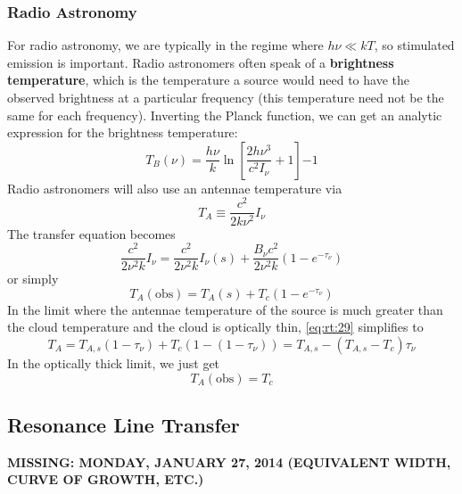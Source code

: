 \documentclass[10pt]{article}
\numberwithin{equation}{section}
\begin{document}
\subsubsection{Radio Astronomy} %
\label{ssub:radio_astronomy}
For radio astronomy, we are typically in the regime where $h\nu\ll kT$, so
stimulated emission is important. Radio astronomers often speak of a
\textbf{brightness temperature}, which is the temperature a source would need
to have the observed brightness at a particular frequency (this temperature
need not be the same for each frequency). Inverting the Planck function, we can
get an analytic expression for the brightness temperature:
\begin{equation}
  \label{eq: rt:26} T_B(\nu) = \frac{h\nu}{k} \ln\left[\frac{2h\nu^3}{c^2
  I_\nu} + 1\right]{-1}
\end{equation}
Radio astronomers will also use an antennae temperature via
\begin{equation}
  \label{eq:rt:27} \boxed{T_A \equiv \frac{c^2}{2k\nu^2}I_\nu}
\end{equation}
The transfer equation becomes
\begin{equation}
  \label{eq:rt:28} \frac{c^2}{2\nu^2k}I_\nu = \frac{c^2}{2\nu^2 k}I_\nu(s) +
  \frac{B_\nu c^2}{2\nu^2k} \left(1-e^{-\tau_\nu}\right)
\end{equation}
or simply
\begin{equation}
  \label{eq:rt:29} T_A(\mathrm{obs}) = T_A(s) + T_c\left(1-e^{-\tau_\nu}\right)
\end{equation}
In the limit where the antennae temperature of the source is much greater than
the cloud temperature and the cloud is optically thin, \eqref{eq:rt:29}
simplifies to
\begin{equation}
  \label{eq:rt:30} T_A = T_{A,s}(1-\tau_\nu) + T_c\left(1-(1-\tau_\nu)\right) =
  T_{A,s} - (T_{A,s} - T_c)\tau_\nu
\end{equation}
In the optically thick limit, we just get
\begin{equation}
  \label{eq:rt:31} T_A(\mathrm{obs}) = T_c
\end{equation}
\subsection{Resonance Line Transfer} %
\label{sub:resonance_line_transfer}
\textbf{MISSING: MONDAY, JANUARY 27, 2014 (EQUIVALENT WIDTH, CURVE OF GROWTH,
ETC.)}\\
\end{document}
